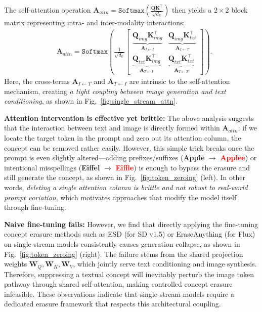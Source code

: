 The self-attention operation $\mathbf{A}_{attn} = \mathtt{Softmax}(\frac{\textbf{Q}\textbf{K}^\top}{\sqrt{d_k}})$ then yields a $2 \times 2$ block matrix representing intra- and inter-modality interactions:
\begin{equation}
\begin{aligned}
    &\mathbf{A}_{attn}
    =
    \mathtt{Softmax}\!\left( \frac{1}{\sqrt{d_k}} 
    \begin{bmatrix}
    \underbrace{\mathbf{Q}_{img}\mathbf{K}_{img}^\top}_{\mathbf{A}_{I \leftarrow I}}
    &
    \underbrace{\mathbf{Q}_{img}\mathbf{K}_{txt}^\top}_{\mathbf{A}_{I \leftarrow T}}
    \\[6pt]
    \underbrace{\mathbf{Q}_{txt}\mathbf{K}_{img}^\top}_{\mathbf{A}_{T \leftarrow I}}
    &
    \underbrace{\mathbf{Q}_{txt}\mathbf{K}_{txt}^\top}_{\mathbf{A}_{T \leftarrow T}}
    \end{bmatrix}\right) .
\end{aligned}
\end{equation}
Here, the cross-terms $\mathbf{A}_{I \leftarrow T}$ and $\mathbf{A}_{T \leftarrow I}$ are intrinsic to the self-attention mechanism, creating \emph{a tight coupling between image generation and text conditioning}, as shown in Fig.~\ref{fig:single_stream_attn}.





\textbf{Attention intervention is effective yet brittle:} 
The above analysis suggests that the interaction between text and image is directly formed within $\mathbf{A}_{attn}$: if we locate the target token in the prompt and zero out its attention column, the concept can be removed rather easily. However, this simple trick breaks once the prompt is even slightly altered—adding prefixes/suffixes (\textcolor[rgb]{0.1, 0.2, 0.4}{\textbf{Apple}} $\rightarrow$ \textcolor{red}{\textbf{Applee}}) or intentional misspellings (\textcolor[rgb]{0.1, 0.2, 0.4}{\textbf{Eiffel}} $\rightarrow$ \textcolor{red}{\textbf{Eiffle}}) is enough to bypass the erasure and still generate the concept, as shown in Fig.~\ref{fig:token_zeroing} (left). In other words, \emph{deleting a single attention column is brittle and not robust to real-world prompt variation}, which motivates approaches that modify the model itself through fine-tuning.





\textbf{Naive fine-tuning fails:}
However, we find that directly applying the fine-tuning concept erasure methods such as ESD (for SD v1.5) or EraseAnything (for Flux) on single-stream models consistently causes generation collapse, as shown in Fig.~\ref{fig:token_zeroing} (right). The failure stems from the shared projection weights $\mathbf{W}_Q,\mathbf{W}_K,\mathbf{W}_V$, which jointly serve text conditioning and image synthesis. Therefore, suppressing a textual concept will inevitably perturb the image token pathway through shared self-attention, making controlled concept erasure infeasible. These observations indicate that single-stream models require a dedicated erasure framework that respects this architectural coupling.

